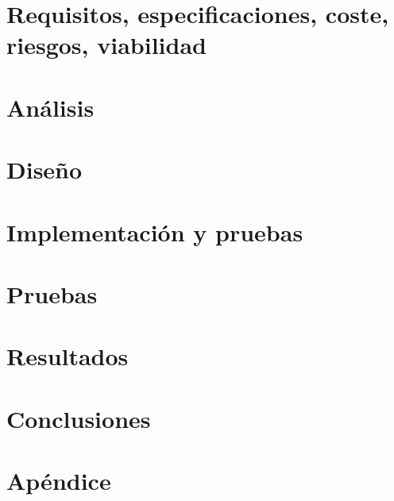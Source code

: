 \documentclass[twoside,spanish,a4paper,12pt]{tfg}
\begin{document}
\chapter{Requisitos, especificaciones, coste, riesgos, viabilidad}


\chapter{Análisis}


\chapter{Diseño}


\chapter{Implementación y pruebas}

\chapter{Pruebas}


\chapter{Resultados}


\chapter{Conclusiones}




\pagestyle{appendix}

\appendix
\chapter{Apéndice}




\end{document}
